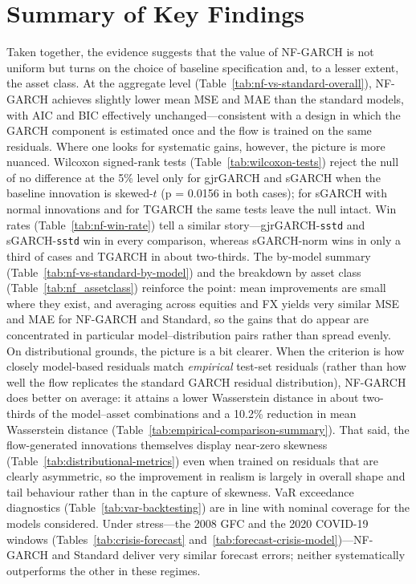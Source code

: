 \documentclass[oneside,12pt]{CUEDthesisPSnPDF}
\begin{document}
\section{Summary of Key Findings}
\label{sec:key_findings}
\noindent
Taken together, the evidence suggests that the value of NF-GARCH is not uniform but turns on the choice of baseline specification and, to a lesser extent, the asset class. At the aggregate level (Table~\ref{tab:nf-vs-standard-overall}), NF-GARCH achieves slightly lower mean MSE and MAE than the standard models, with AIC and BIC effectively unchanged---consistent with a design in which the GARCH component is estimated once and the flow is trained on the same residuals. Where one looks for systematic gains, however, the picture is more nuanced. Wilcoxon signed-rank tests (Table~\ref{tab:wilcoxon-tests}) reject the null of no difference at the 5\% level only for gjrGARCH and sGARCH when the baseline innovation is skewed-$t$ (p = 0.0156 in both cases); for sGARCH with normal innovations and for TGARCH the same tests leave the null intact. Win rates (Table~\ref{tab:nf-win-rate}) tell a similar story---gjrGARCH-\texttt{sstd} and sGARCH-\texttt{sstd} win in every comparison, whereas sGARCH-norm wins in only a third of cases and TGARCH in about two-thirds. The by-model summary (Table~\ref{tab:nf-vs-standard-by-model}) and the breakdown by asset class (Table~\ref{tab:nf_assetclass}) reinforce the point: mean improvements are small where they exist, and averaging across equities and FX yields very similar MSE and MAE for NF-GARCH and Standard, so the gains that do appear are concentrated in particular model--distribution pairs rather than spread evenly.\\

\medskip
\noindent
On distributional grounds, the picture is a bit clearer. When the criterion is how closely model-based residuals match \emph{empirical} test-set residuals (rather than how well the flow replicates the standard GARCH residual distribution), NF-GARCH does better on average: it attains a lower Wasserstein distance in about two-thirds of the model--asset combinations and a 10.2\% reduction in mean Wasserstein distance (Table~\ref{tab:empirical-comparison-summary}). That said, the flow-generated innovations themselves display near-zero skewness (Table~\ref{tab:distributional-metrics}) even when trained on residuals that are clearly asymmetric, so the improvement in realism is largely in overall shape and tail behaviour rather than in the capture of skewness. VaR exceedance diagnostics (Table~\ref{tab:var-backtesting}) are in line with nominal coverage for the models considered. Under stress---the 2008 GFC and the 2020 COVID-19 windows (Tables~\ref{tab:crisis-forecast} and~\ref{tab:forecast-crisis-model})---NF-GARCH and Standard deliver very similar forecast errors; neither systematically outperforms the other in these regimes.\\
\end{document}
